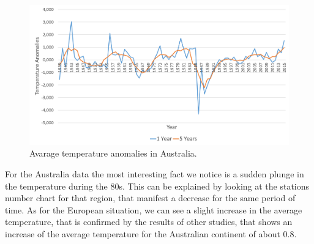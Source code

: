 \documentclass{vldb}
\begin{document}
\begin{figure}[tbh]
\includegraphics[width=1\linewidth]{AuAnomalies}
\caption{Avarage temperature anomalies in Australia.}
\label{fig:AuAnomalies}
\end{figure}

For the Australia data the most interesting fact we notice is a sudden plunge in the temperature during the 80s. This can be explained by looking at the stations number chart for that region, that manifest a decrease for the same period of time. As for the European situation, we can see a slight increase in the average temperature, that is confirmed by the results of other studies, that shows an increase of the average temperature for the Australian continent of about 0.8\degree.
\end{document}
